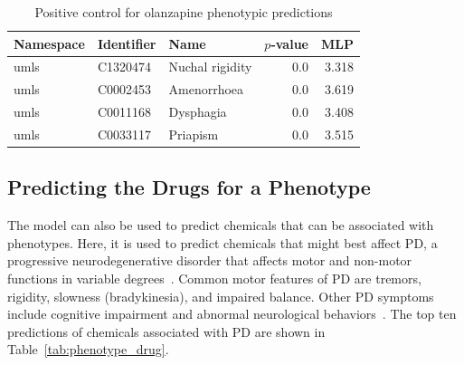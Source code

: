 \begin{table}
    \centering
    \begin{tabular}{|l|l|l|r|r|}
        \hline
        \textbf{Namespace} & \textbf{Identifier} & \textbf{Name} & \textbf{$p$-value} & \textbf{MLP} \\
        \hline
        umls & C1320474 & Nuchal rigidity & 0.0 & 3.318 \\
        \hline
        umls & C0002453 & Amenorrhoea & 0.0 & 3.619 \\
        \hline
        umls & C0011168 & Dysphagia & 0.0 & 3.408 \\
        \hline
        umls & C0033117 & Priapism & 0.0 & 3.515 \\
        \hline
    \end{tabular}
    \caption{Positive control for olanzapine phenotypic predictions}
    \label{tab:ps_olanzapine}
\end{table}


\subsection{Predicting the Drugs for a Phenotype}

The model can also be used to predict chemicals that can be associated with phenotypes.
Here, it is used to predict chemicals that might best affect \ac{PD}, a progressive neurodegenerative disorder that affects motor and non-motor functions in variable degrees~\cite{jankovic_parkinsons_2008}.
Common motor features of \ac{PD} are tremors, rigidity, slowness (bradykinesia), and impaired balance.
Other \ac{PD} symptoms include cognitive impairment and abnormal neurological behaviors~\cite{jankovic_parkinsons_2008}.
The top ten predictions of chemicals associated with \ac{PD} are shown in Table~\ref{tab:phenotype_drug}.

